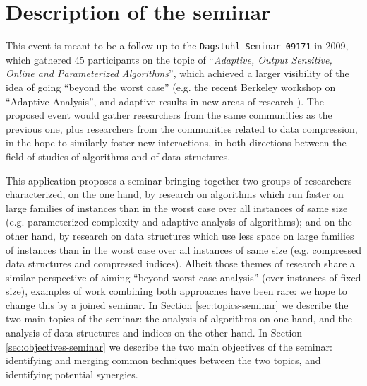 \documentclass[a4paper,10pt]{article}
\begin{document}


\section{Description of the seminar}

\begin{INUTILE}
This event is meant to be a follow-up to the \texttt{Dagstuhl Seminar 09171} in 2009, which gathered 45 participants on the topic of ``\emph{Adaptive, Output Sensitive, Online and Parameterized Algorithms}'', which achieved a larger visibility of the idea of going ``beyond the worst case'' (e.g. the recent Berkeley workshop on ``Adaptive Analysis'', and adaptive results in new areas of research \cite{2015-SPIRE-AdaptiveComputationOfTheSwapInsertCorrectionDistance-BarbayPerez}). The proposed event would gather researchers from the same communities as the previous one, plus researchers from the communities related to data compression, in the hope to similarly foster new interactions, in both directions between the field of studies of algorithms and of data structures.
\end{INUTILE}

This application proposes a seminar bringing together two groups of researchers characterized, on the one hand, by research on algorithms which run faster on large families of instances than in the worst case over all instances of same size  (e.g. parameterized complexity and adaptive analysis of algorithms); and on the other hand, by research on data structures which use less space on large families of instances than in the worst case over all instances of same size (e.g. compressed data structures and compressed indices). 
%
Albeit those themes of research share a similar perspective of aiming ``beyond worst case analysis'' (over instances of fixed size), examples of work combining both approaches have been rare: we hope to change this by a joined seminar.  
%
In Section \ref{sec:topics-seminar} we describe the two main topics of the seminar: the analysis of algorithms on one hand, and the analysis of data structures and indices on the other hand. In Section \ref{sec:objectives-seminar} we describe the two main objectives of the seminar: identifying and merging common techniques between the two topics, and identifying potential synergies.
\end{document}
